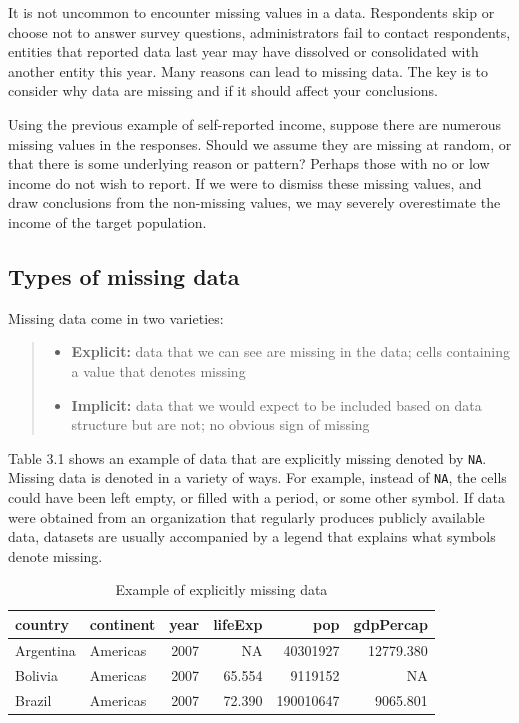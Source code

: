 \documentclass[
]{book}
\providecommand{\tightlist}{%
  \setlength{\itemsep}{0pt}\setlength{\parskip}{0pt}}
\begin{document}
It is not uncommon to encounter missing values in a data. Respondents skip or choose not to answer survey questions, administrators fail to contact respondents, entities that reported data last year may have dissolved or consolidated with another entity this year. Many reasons can lead to missing data. The key is to consider why data are missing and if it should affect your conclusions.

Using the previous example of self-reported income, suppose there are numerous missing values in the responses. Should we assume they are missing at random, or that there is some underlying reason or pattern? Perhaps those with no or low income do not wish to report. If we were to dismiss these missing values, and draw conclusions from the non-missing values, we may severely overestimate the income of the target population.

\hypertarget{types-of-missing-data}{%
\subsection{Types of missing data}\label{types-of-missing-data}}

Missing data come in two varieties:

\begin{quote}
\begin{itemize}
\tightlist
\item
  \textbf{Explicit:} data that we can see are missing in the data; cells containing a value that denotes missing
\item
  \textbf{Implicit:} data that we would expect to be included based on data structure but are not; no obvious sign of missing
\end{itemize}
\end{quote}

Table 3.1 shows an example of data that are explicitly missing denoted by \texttt{NA}. Missing data is denoted in a variety of ways. For example, instead of \texttt{NA}, the cells could have been left empty, or filled with a period, or some other symbol. If data were obtained from an organization that regularly produces publicly available data, datasets are usually accompanied by a legend that explains what symbols denote missing.

\begin{table}

\caption{\label{tab:unnamed-chunk-1}Example of explicitly missing data}
\centering
\begin{tabular}[t]{l|l|r|r|r|r}
\hline
country & continent & year & lifeExp & pop & gdpPercap\\
\hline
Argentina & Americas & 2007 & NA & 40301927 & 12779.380\\
\hline
Bolivia & Americas & 2007 & 65.554 & 9119152 & NA\\
\hline
Brazil & Americas & 2007 & 72.390 & 190010647 & 9065.801\\
\hline
\end{tabular}
\end{table}
\end{document}
